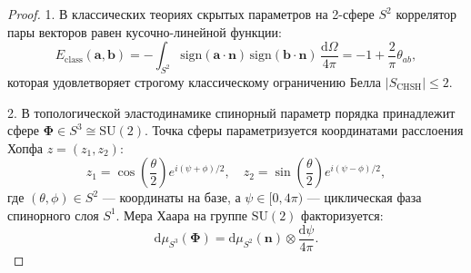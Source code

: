 \documentclass[11pt,a4paper]{article}
\theoremstyle{definition}
\theoremstyle{remark}
\begin{document}
\begin{proof}
1. В классических теориях скрытых параметров на 2-сфере $S^2$ коррелятор пары векторов равен кусочно-линейной функции:
\begin{equation}
    E_{\mathrm{class}}(\mathbf{a}, \mathbf{b}) = -\int_{S^2} \mathrm{sign}(\mathbf{a} \cdot \mathbf{n}) \, \mathrm{sign}(\mathbf{b} \cdot \mathbf{n}) \, \frac{\mathrm{d}\Omega}{4\pi} = -1 + \frac{2}{\pi}\theta_{ab},
\end{equation}
которая удовлетворяет строгому классическому ограничению Белла $|S_{\mathrm{CHSH}}| \le 2$.

2. В топологической эластодинамике спинорный параметр порядка принадлежит сфере $\boldsymbol{\Phi} \in S^3 \cong \mathrm{SU}(2)$. Точка сферы параметризуется координатами расслоения Хопфа $z = (z_1, z_2)$:
\begin{equation}
    z_1 = \cos\left(\frac{\theta}{2}\right) e^{i(\psi + \phi)/2}, \quad z_2 = \sin\left(\frac{\theta}{2}\right) e^{i(\psi - \phi)/2},
\end{equation}
где $(\theta, \phi) \in S^2$ --- координаты на базе, а $\psi \in [0, 4\pi)$ --- циклическая фаза спинорного слоя $S^1$. Мера Хаара на группе $\mathrm{SU}(2)$ факторизуется:
\begin{equation}
    \mathrm{d}\mu_{S^3}(\boldsymbol{\Phi}) = \mathrm{d}\mu_{S^2}(\mathbf{n}) \otimes \frac{\mathrm{d}\psi}{4\pi}.
\end{equation}


\end{proof}
\end{document}
